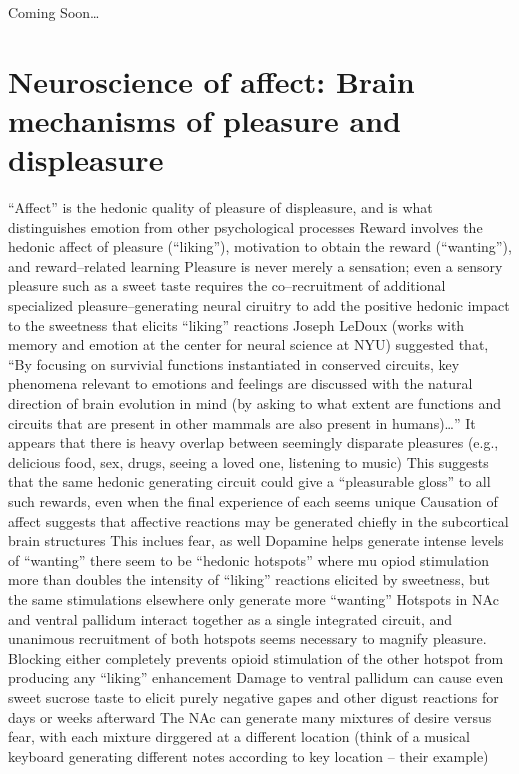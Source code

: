 \documentclass[11pt, a4paper, oneside]{article}   	%
\begin{document}
Coming Soon\ldots

\section{Neuroscience of affect: Brain mechanisms of pleasure and displeasure \cite{Berridge2013}}

\begin{outline}
    \point ``Affect'' is the hedonic quality of pleasure of displeasure, and is what distinguishes emotion from other psychological processes
    \point Reward involves the hedonic affect of pleasure (``liking''), motivation to obtain the reward (``wanting''), and reward--related learning
    \point Pleasure is never merely a sensation; even a sensory pleasure such as a sweet taste requires the co--recruitment of additional specialized pleasure--generating neural ciruitry to add the positive hedonic impact to the sweetness that elicits ``liking'' reactions
    \point Joseph LeDoux (works with memory and emotion at the center for neural science at NYU) suggested that, ``By focusing on survivial functions instantiated in conserved circuits, key phenomena relevant to emotions and feelings are discussed with the natural direction of brain evolution in mind (by asking to what extent are functions and circuits that are present in other mammals are also present in humans)\ldots''
    \point It appears that there is heavy overlap between seemingly disparate pleasures (e.g., delicious food, sex, drugs, seeing a loved one, listening to music)
        \subpoint This suggests that the same hedonic generating circuit could give a ``pleasurable gloss'' to all such rewards, even when the final experience of each seems unique
    \point Causation of affect suggests that affective reactions may be generated chiefly in the subcortical brain structures 
        \subpoint This inclues fear, as well
    \point Dopamine helps generate intense levels of ``wanting''
    \point there seem to be ``hedonic hotspots'' where mu opiod stimulation more than doubles the intensity of ``liking'' reactions elicited by sweetness, but the same stimulations elsewhere only generate more ``wanting''
    \point Hotspots in NAc and ventral pallidum interact together as a single integrated circuit, and unanimous recruitment of both hotspots seems necessary to magnify pleasure. Blocking either completely prevents opioid stimulation of the other hotspot from producing any ``liking'' enhancement
    \point Damage to ventral pallidum can cause even sweet sucrose taste to elicit purely negative gapes and other digust reactions for days or weeks afterward
    \point The NAc can generate many mixtures of desire versus fear, with each mixture dirggered at a different location (think of a musical keyboard generating different notes according to key location -- their example)
\end{outline}
\end{document}
